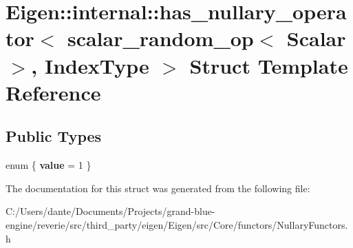 \hypertarget{struct_eigen_1_1internal_1_1has__nullary__operator_3_01scalar__random__op_3_01_scalar_01_4_00_01_index_type_01_4}{}\section{Eigen\+::internal\+::has\+\_\+nullary\+\_\+operator$<$ scalar\+\_\+random\+\_\+op$<$ Scalar $>$, Index\+Type $>$ Struct Template Reference}
\label{struct_eigen_1_1internal_1_1has__nullary__operator_3_01scalar__random__op_3_01_scalar_01_4_00_01_index_type_01_4}
\subsection*{Public Types}
\begin{DoxyCompactItemize}
\item 
\mbox{\label{struct_eigen_1_1internal_1_1has__nullary__operator_3_01scalar__random__op_3_01_scalar_01_4_00_01_index_type_01_4_a02ab1c393fde80dbbd8afbe437c005c3}} 
enum \{ {\bfseries value} = 1
 \}
\end{DoxyCompactItemize}


The documentation for this struct was generated from the following file\+:\begin{DoxyCompactItemize}
\item 
C\+:/\+Users/dante/\+Documents/\+Projects/grand-\/blue-\/engine/reverie/src/third\+\_\+party/eigen/\+Eigen/src/\+Core/functors/Nullary\+Functors.\+h\end{DoxyCompactItemize}
